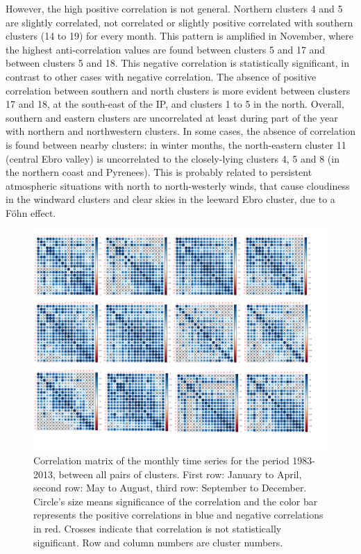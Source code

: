 \begin{subappendices}
However, the high positive correlation is not general. Northern clusters 4 and 5 are slightly correlated, not correlated or slightly positive correlated with southern clusters (14 to 19) for every month. This pattern is amplified in November, where the highest anti-correlation values are found between clusters 5 and 17 and between clusters 5 and 18. This negative correlation is statistically significant, in contrast to other cases with negative correlation. The absence of positive correlation between southern and north clusters is more evident between clusters 17 and 18, at the south-east of the IP, and clusters 1 to 5 in the north. Overall, southern and eastern clusters are uncorrelated at least during part of the year with northern and northwestern clusters. In some cases, the absence of correlation is found between nearby clusters: in winter months, the north-eastern cluster 11 (central Ebro valley) is uncorrelated to the closely-lying clusters 4, 5 and 8 (in the northern coast and Pyrenees). This is probably related to persistent atmospheric situations with north to north-westerly winds, that cause cloudiness in the windward clusters and clear skies in the leeward Ebro cluster, due to a Föhn effect.


\begin{figure} [h!]
\includegraphics[scale=0.6]{figs/capitulo5/correlaciones_30.pdf}
\caption{Correlation matrix of the monthly time series for the period 1983-2013, between all pairs of clusters. First row: January to April, second row: May to August, third row: September to December. Circle’s size means significance of the correlation and the color bar represents the positive correlations in blue and negative correlations in red. Crosses indicate that correlation is not statistically significant. Row and column numbers are cluster numbers.}
\label{correlaciones_30}
\end{figure}


\end{subappendices}
